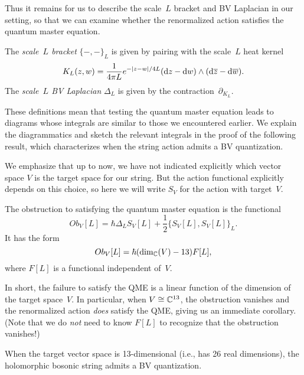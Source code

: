 Thus it remains for us to describe the scale~$L$ bracket and BV Laplacian in our setting,
so that we can examine whether the renormalized action satisfies the quantum master equation.

\begin{dfn}
The {\em scale~$L$ bracket} $\{-,-\}_L$ is given by pairing with the scale~$L$ heat kernel
\[
K_L(z,w) = \frac{1}{4\pi L} e^{-|z-w|/4L} ({\rm d} z - {\rm d} w) \wedge ({\rm d}\overline{z} - {\rm d}\overline{w}). 
\]
The {\em scale~$L$ BV Laplacian} $\Delta_L$ is given by the contraction~$\partial_{K_L}$.
\end{dfn}

These definitions mean that testing the quantum master equation leads to diagrams whose integrals are similar to those we encountered earlier.
We explain the diagrammatics and sketch the relevant integrals in the proof of the following result,
which characterizes when the string action admits a BV quantization.

We emphasize that up to now, we have not indicated explicitly which vector space $V$ is the target space for our string.
But the action functional explicitly depends on this choice,
so here we will write $S_V$ for the action with target~$V$.

\begin{prop} \label{prop anomaly}
The obstruction to satisfying the quantum master equation is the functional
\[
Ob_V[L] = \hbar \Delta_{L} S_V[L] + \frac{1}{2}\{S_V[L],S_V[L]\}_L.
\]
It has the form
\[
Ob_V[L] = \hbar (\dim_\mathbb C(V) - 13) F[L],
\]
where $F[L]$ is a functional independent of~$V$.
\end{prop}

In short, the failure to satisfy the QME is a linear function of the dimension of the target space~$V$.
In particular, when $V \cong \mathbb C^{13}$, 
the obstruction vanishes and the renormalized action {\em does} satisfy the QME, 
giving us an immediate corollary.
(Note that we do {\em not} need to know $F[L]$ to recognize that the obstruction vanishes!)

\begin{cor}
When the target vector space is 13-dimensional (i.e., has 26 real dimensions),
the holomorphic bosonic string admits a BV quantization.
\end{cor}

